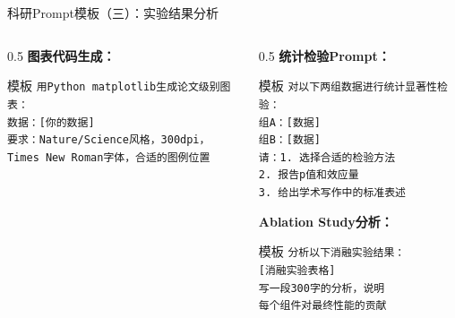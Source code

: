 \documentclass[aspectratio=169,11pt]{beamer}
\begin{document}
\begin{frame}[fragile]{科研Prompt模板（三）：实验结果分析}
\begin{columns}
\begin{column}{0.5\textwidth}
            \vspace{0.2cm}
            \textbf{图表代码生成：}
            \begin{exampleblock}{模板}
                \scriptsize
                \texttt{用Python matplotlib生成论文级别图表：}\\
                \texttt{数据：[你的数据]}\\
                \texttt{要求：Nature/Science风格，300dpi，}\\
                \texttt{Times New Roman字体，合适的图例位置}
            \end{exampleblock}
        \end{column}
        \begin{column}{0.5\textwidth}
            \textbf{统计检验Prompt：}
            \begin{exampleblock}{模板}
                \scriptsize
                \texttt{对以下两组数据进行统计显著性检验：}\\
                \texttt{组A：[数据]}\\
                \texttt{组B：[数据]}\\
                \texttt{请：1. 选择合适的检验方法}\\
                \texttt{2. 报告p值和效应量}\\
                \texttt{3. 给出学术写作中的标准表述}
            \end{exampleblock}
            
            \vspace{0.2cm}
            \textbf{Ablation Study分析：}
            \begin{exampleblock}{模板}
                \scriptsize
                \texttt{分析以下消融实验结果：}\\
                \texttt{[消融实验表格]}\\
                \texttt{写一段300字的分析，说明}\\
                \texttt{每个组件对最终性能的贡献}
            \end{exampleblock}
        \end{column}
    \end{columns}
\end{frame}
\end{document}
